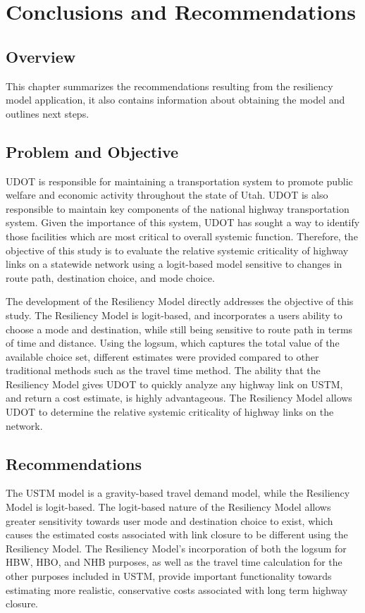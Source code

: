 \chapter{Conclusions and Recommendations}
\label{chp:chapter5}
\graphicspath{{figures/}{figures/chapter5/}}

\section{Overview}

This chapter summarizes the recommendations resulting from the resiliency
model application, it also contains information about obtaining the model and
outlines next steps.

\section{Problem and Objective}

UDOT is responsible for maintaining a
transportation system to promote public welfare and economic activity throughout
the state of Utah. UDOT is also responsible to maintain key components of the
national highway transportation system. Given the importance of this system,
UDOT has sought a way to identify those facilities which are most critical to
overall systemic function. Therefore, the objective of this study is to evaluate the relative systemic
criticality of highway links on a statewide network using a logit-based model
sensitive to changes in route path, destination choice, and mode choice.

The development of the Resiliency Model directly addresses the objective of
this study. The Resiliency Model is logit-based, and incorporates a users
ability to choose a mode and destination, while still being sensitive to route
path in terms of time and distance. Using the logsum, which captures the total
value of the available choice set, different estimates were provided compared to
other traditional methods such as the travel time method. The ability that the
Resiliency Model gives UDOT to quickly analyze any highway link on USTM, and return a
cost estimate, is highly advantageous. The Resiliency Model allows UDOT to determine
the relative systemic criticality of highway links on the network.

\section{Recommendations}

The USTM model is a gravity-based travel demand model, while the Resiliency
Model is logit-based. The logit-based nature of the Resiliency Model allows
greater sensitivity towards user mode and destination choice to exist, which causes
the estimated costs associated with link closure to be different using the Resiliency Model. The Resiliency
Model's incorporation of both the logsum for HBW, HBO, and NHB purposes, as
well as the travel time calculation for the other purposes included in USTM,
provide important functionality towards estimating more realistic, conservative costs
associated with long term highway closure.


